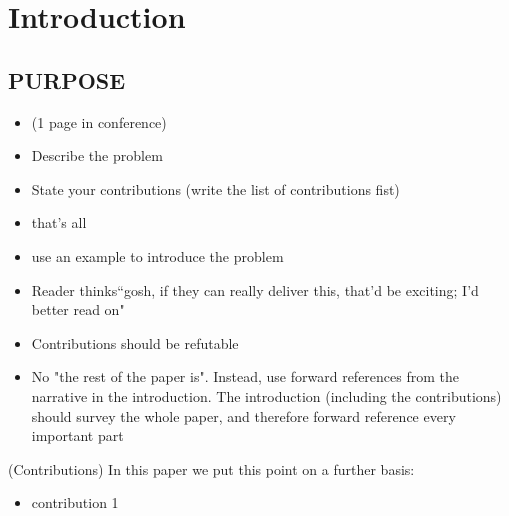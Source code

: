 
\chapter{Introduction}
\label{ch:Introduction}

\section*{PURPOSE}
\begin{itemize}
\item (1 page in conference)
\item Describe the problem
\item State your contributions (write the list of contributions fist)
\item that's all
\item use an example to introduce the problem
\item Reader thinks``gosh, if they can really deliver this, that'd be exciting; I’d better read on" \cite{jones2013how}
\item Contributions should be refutable
\item No "the rest of the paper is". Instead, use forward references from the narrative in the introduction. The introduction (including the contributions) should survey the whole paper, and therefore forward reference every important part
\end{itemize}

(Contributions) In this paper we put this point on a further basis:
\begin{itemize}
\item contribution 1
\end{itemize}

\endinput

Any text after an \endinput is ignored.
You could put scraps here or things in progress.
